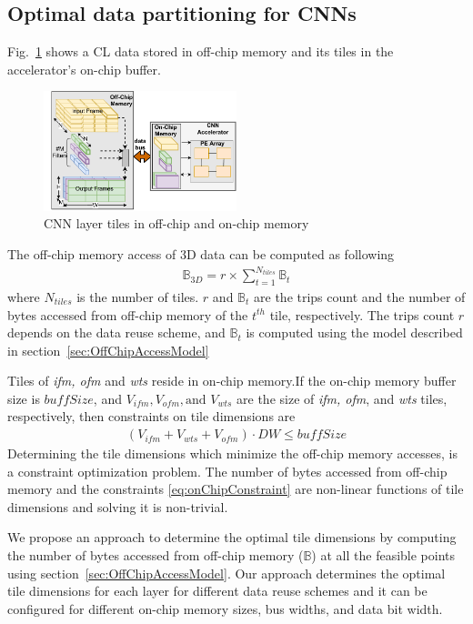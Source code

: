 \documentclass[a4paper,10pt]{article}
\newcommand{\numBytesOffChip}{\mathbb{B}}
\newcommand{\BuffSize}{buffSize}
\begin{document}
\subsection{Optimal data partitioning for CNNs}
Fig.~\ref{fig:partitioningDataUsingTiling} shows a CL data stored in off-chip memory and its tiles in the accelerator's on-chip buffer.
\begin{figure}[!htb]
	\centering
	\includegraphics[width=0.5\textwidth]{images/AboutTheCNNTiles.pdf}
	\caption{CNN layer tiles in off-chip and on-chip memory}
	\label{fig:partitioningDataUsingTiling}
	\vspace{-1.0em}
\end{figure}
The off-chip memory access of 3D data can be computed as following
\begin{align}\label{eq:BasicOffChip3DDataAccess}
	\numBytesOffChip_{3D}{=}r{\times} \sum_{t=1}^{N_{tiles}}{\numBytesOffChip_{t}}
\end{align}
where $N_{tiles}$ is the number of tiles. $r$ and $\numBytesOffChip_{t}$ are the trips count and the number of bytes accessed from off-chip memory of the $t^{th}$ tile, respectively.  The trips count $r$ depends on the data reuse scheme, and $\numBytesOffChip_{t}$  is computed using the model described in section~\ref{sec:OffChipAccessModel}

Tiles of \textit{ifm, ofm} and \textit{wts} reside in on-chip memory.If the on-chip memory buffer size is $\BuffSize$, and $V_{ifm}, V_{ofm}, \text{and }V_{wts}$ are the size of \textit{ifm, ofm}, and \textit{wts} tiles, respectively, then constraints on tile dimensions are
\begin{align}\label{eq:onChipConstraint}
		(V_{ifm}{+}V_{wts}{+}V_{ofm})\cdot{DW}\leq \BuffSize 
\end{align}
Determining the tile dimensions which minimize the off-chip memory accesses, is a constraint optimization problem. The  number of bytes accessed from off-chip memory and the constraints \eqref{eq:onChipConstraint} are non-linear functions of tile dimensions and solving it is non-trivial.

We propose an approach to determine the optimal tile dimensions by computing the number of bytes accessed from off-chip memory ($\numBytesOffChip$) at all the feasible points using section~\ref{sec:OffChipAccessModel}. Our approach determines the optimal tile dimensions for each layer for different data reuse schemes and it can be configured for different on-chip memory sizes, bus widths, and data bit width. 
\end{document}
